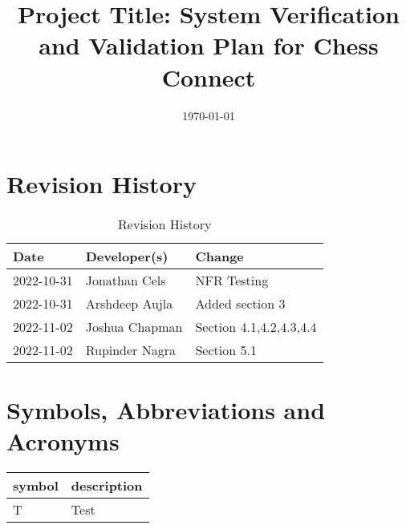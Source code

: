 \documentclass[12pt, titlepage]{article}
\begin{document}
\title{Project Title: System Verification and Validation Plan for Chess Connect} 
\author{\authname}
\date{\today}
	
\maketitle


\section{Revision History}

\begin{table}[hp]
\caption{Revision History} \label{TblRevisionHistory}
\begin{tabularx}{\textwidth}{llX}
\toprule
\textbf{Date} & \textbf{Developer(s)} & \textbf{Change}\\
\midrule
2022-10-31 & Jonathan Cels & NFR Testing\\
2022-10-31 & Arshdeep Aujla & Added section 3\\
2022-11-02 & Joshua Chapman & Section 4.1,4.2,4.3,4.4\\
2022-11-02 & Rupinder Nagra & Section 5.1\\
\bottomrule
\end{tabularx}
\end{table}

\newpage

\tableofcontents

\listoftables
{}

\listoffigures
{}

\newpage

\section{Symbols, Abbreviations and Acronyms}

\renewcommand{\arraystretch}{1.2}
\begin{tabular}{l l} 
  \toprule		
  \textbf{symbol} & \textbf{description}\\
  \midrule 
  T & Test\\
  \bottomrule
\end{tabular}\\

\end{document}
